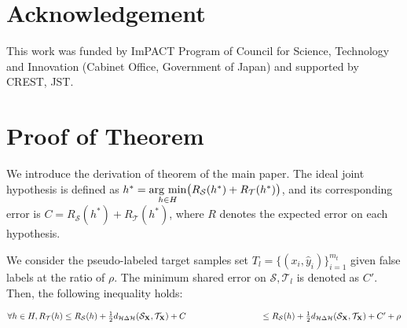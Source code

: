 \documentclass{article}
\newcommand{\argmin}{\mathop{\rm arg~min}\limits}
\begin{document}
\section{Acknowledgement}
This work was funded by ImPACT Program of Council for Science, Technology and Innovation (Cabinet Office, Government of Japan) and supported by CREST, JST.



\newpage
\section*{Proof of Theorem}
We introduce the derivation of theorem of the main paper.
The ideal joint hypothesis is defined as $h^{*}= \argmin_{h\in H}\bigl(R_{\mathcal{S}}(h^{*})+R_{\mathcal{T}}(h^{*})\bigr)$, and its corresponding error is $C=R_{\mathcal{S}}(h^{*})+R_{\mathcal{T}}(h^{*})$, where $R$ denotes the expected error on each hypothesis.

We consider the pseudo-labeled target samples set $T_{l}=\bigl\{(x_i,\hat{y}_i)\bigr\}^{m_t}_{i=1}$ given false labels at the ratio of $\rho$. The minimum shared error on $\mathcal{S},\mathcal{T}_{l}$ is denoted as $C{'}$. Then, the following inequality holds:

\begin{math}
\forall h  \in H, R_{\mathcal{T}}(h) \leq R_{\mathcal{S}}(h)  +\frac{1}{2}{d_{\mathcal{H} \Delta \mathcal{H}}(\mathcal{S}_{{\bf X}},\mathcal{T}_{{\bf X}})}+C\\\\
						   \ \ \ \ \ \ \ \ \ \ \ \ \ \ \ \ \ \ \ \ \ \ \ \ \ \ \leq	R_{\mathcal{S}}(h)  +\frac{1}{2}{d_{\mathcal{H} \Delta \mathcal{H}}(\mathcal{S}_{{\bf X}},\mathcal{T}_{{\bf X}})}+C{'}+\rho
\end{math}
\end{document}
